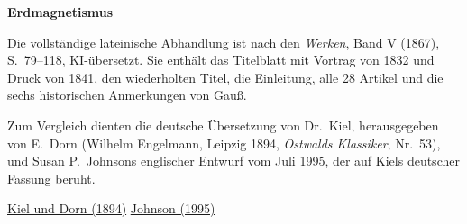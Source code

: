 \clearpage
\thispagestyle{empty}
\begin{center}\Large\textbf{Erdmagnetismus}\end{center}
Die vollständige lateinische Abhandlung ist nach den \textit{Werken}, Band V (1867), S.~79--118, KI-übersetzt. Sie enthält das Titelblatt mit Vortrag von 1832 und Druck von 1841, den wiederholten Titel, die Einleitung, alle 28 Artikel und die sechs historischen Anmerkungen von Gauß.

Zum Vergleich dienten die deutsche Übersetzung von Dr.~Kiel, herausgegeben von E.~Dorn (Wilhelm Engelmann, Leipzig 1894, \textit{Ostwalds Klassiker}, Nr.~53), und Susan P.~Johnsons englischer Entwurf vom Juli 1995, der auf Kiels deutscher Fassung beruht.

\noindent\href{https://archive.org/details/dieintensittde00gausuoft}{Kiel und Dorn (1894)}\quad
\href{https://21sci-tech.com/translations/gaussMagnetic.pdf}{Johnson (1995)}

\noindent
\clearpage

